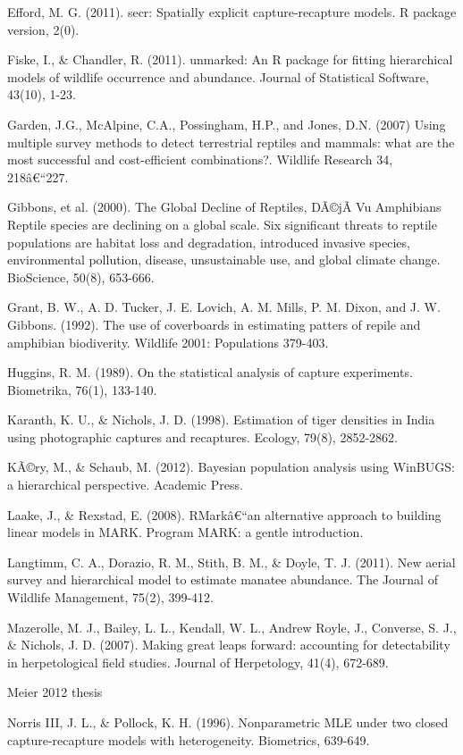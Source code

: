 \documentclass{book}
\begin{document}
\rf Efford, M. G. (2011). secr: Spatially explicit capture-recapture models. R package version, 2(0).

\rf Fiske, I., \& Chandler, R. (2011). unmarked: An R package for fitting hierarchical models of wildlife occurrence and abundance. Journal of Statistical Software, 43(10), 1-23.

\rf Garden, J.G., McAlpine, C.A., Possingham, H.P., and Jones, D.N. (2007) Using multiple survey methods to detect terrestrial reptiles and mammals: what are the most successful and cost-efficient combinations?. Wildlife Research 34, 218â€“227.

\rf Gibbons, et al. (2000). The Global Decline of Reptiles, DÃ©jÃ  Vu Amphibians Reptile species are declining on a global scale. Six significant threats to reptile populations are habitat loss and degradation, introduced invasive species, environmental pollution, disease, unsustainable use, and global climate change. BioScience, 50(8), 653-666.

\rf Grant, B. W., A. D. Tucker, J. E. Lovich, A. M. Mills, P. M. Dixon, and J. W. Gibbons. (1992). The use of coverboards in estimating patters of repile and amphibian biodiverity. Wildlife 2001: Populations 379-403.

\rf Huggins, R. M. (1989). On the statistical analysis of capture experiments. Biometrika, 76(1), 133-140.

\rf  Karanth, K. U., \& Nichols, J. D. (1998). Estimation of tiger densities in India using photographic captures and recaptures. Ecology, 79(8), 2852-2862.

\rf KÃ©ry, M., \& Schaub, M. (2012). Bayesian population analysis using WinBUGS: a hierarchical perspective. Academic Press.

\rf Laake, J., \& Rexstad, E. (2008). RMarkâ€“an alternative approach to building linear models in MARK. Program MARK: a gentle introduction.

\rf Langtimm, C. A., Dorazio, R. M., Stith, B. M., \& Doyle, T. J. (2011). New aerial survey and hierarchical model to estimate manatee abundance. The Journal of Wildlife Management, 75(2), 399-412.

\rf Mazerolle, M. J., Bailey, L. L., Kendall, W. L., Andrew Royle, J., Converse, S. J., \& Nichols, J. D. (2007). Making great leaps forward: accounting for detectability in herpetological field studies. Journal of Herpetology, 41(4), 672-689.

\rf Meier 2012 thesis

\rf Norris III, J. L., \& Pollock, K. H. (1996). Nonparametric MLE under two closed capture-recapture models with heterogeneity. Biometrics, 639-649.
\end{document}

